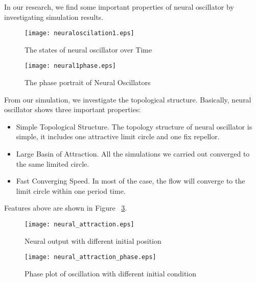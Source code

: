 In our research, we find some important properties of neural oscillator by investigating simulation results.

\begin{figure}
\begin{center}
\texttt{[image: neuraloscilation1.eps]}
\end{center}
\caption{The states of neural oscillator over Time}
\label{fig:oscilation}
\end{figure}

\begin{figure}
\begin{center}
\texttt{[image: neural1phase.eps]}
\end{center}
\caption{The phase portrait of Neural Oscillators}
\label{fig:oscilationphase}
\end{figure}

From our simulation, we investigate the topological structure.
Basically, neural oscillator shows three important properties:
\begin{itemize}
\item{Simple Topological Structure.}
The topology structure of neural oscillator is simple, 
it includes one  attractive limit circle and one fix repellor.
\item{Large Basin of Attraction.}
All the simulations we carried out converged to the same limited circle.
\item{Fast Converging Speed.}
In most of the case, the flow will converge to the limit circle within one period time.
\end{itemize}

Features above are shown in Figure ~\ref{fig:time_timeAttraction}.
\begin{figure}
\begin{center}
\texttt{[image: neural\_attraction.eps]}
\end{center}
\caption{Neural output with different initial position}
\label{fig:time_timeAttraction}
\end{figure}

\begin{figure}
\begin{center}
\texttt{[image: neural\_attraction\_phase.eps]}
\end{center}
\caption{Phase plot of oscillation with different initial condition}
\label{fig:phase_attraction}
\end{figure}
 
